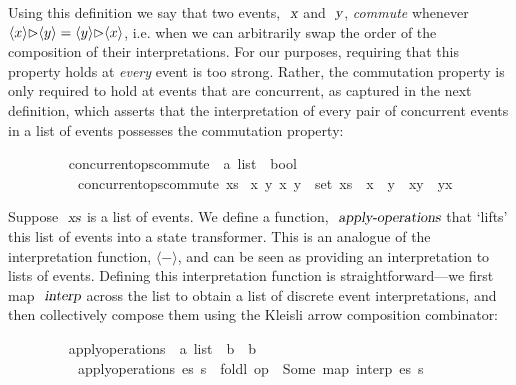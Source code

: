 Using this definition we say that two events, $\isa{x}$ and $\isa{y}$, \emph{commute} whenever $\langle x \rangle {\emph{$\rhd$}} \langle y \rangle = \langle y \rangle {\emph{$\rhd$}} \langle x \rangle$, i.e. when we can arbitrarily swap the order of the composition of their interpretations.
For our purposes, requiring that this property holds at \emph{every} event is too strong.
Rather, the commutation property is only required to hold at events that are concurrent, as captured in the next definition, which asserts that the interpretation of every pair of concurrent events in a list of events possesses the commutation property:
\vspace{0.375em}
\begin{isabellebody}
\ \ \ \ \ \ \ \  concurrent{\isacharunderscore}ops{\isacharunderscore}commute\ {\isacharcolon}{\isacharcolon}\ {\isachardoublequoteopen}{\isacharprime}a\ list\ {\isasymRightarrow}\ bool{\isachardoublequoteclose}\ \isanewline
\ \ \ \ \ \ \ \ \ \ {\isachardoublequoteopen}concurrent{\isacharunderscore}ops{\isacharunderscore}commute\ xs\ {\isasymequiv} {\isasymforall}x\ y{\isachardot}\ {\isacharbraceleft}x{\isacharcomma}\ y{\isacharbraceright}\ {\isasymsubseteq}\ set\ xs\ {\isasymlongrightarrow}\ x\ {\isasymparallel}\ y\ {\isasymlongrightarrow}\ {\isasymlangle}x{\isasymrangle}{\isasymrhd}{\isasymlangle}y{\isasymrangle}\ {\isacharequal}\ {\isasymlangle}y{\isasymrangle}{\isasymrhd}{\isasymlangle}x{\isasymrangle}{\isachardoublequoteclose}
\end{isabellebody}
\vspace{0.375em}
Suppose $\isa{xs}$ is a list of events.
We define a function, $\isa{apply-operations}$ that `lifts' this list of events into a state transformer.
This is an analogue of the interpretation function, $\langle-\rangle$, and can be seen as providing an interpretation to lists of events.
Defining this interpretation function is straightforward---we first map $\isa{interp}$ across the list to obtain a list of discrete event interpretations, and then collectively compose them using the Kleisli arrow composition combinator:
\vspace{0.375em}
\begin{isabellebody}
\ \ \ \ \ \ \ \  apply{\isacharunderscore}operations\ {\isacharcolon}{\isacharcolon}\ {\isachardoublequoteopen}{\isacharprime}a\ list\ {\isasymRightarrow}\ {\isacharprime}b\ {\isasymrightharpoonup}\ {\isacharprime}b{\isachardoublequoteclose}\ \isanewline
\ \ \ \ \ \ \ \ \ \ {\isachardoublequoteopen}apply{\isacharunderscore}operations\ es\ s\ {\isasymequiv}\ {\isacharparenleft}foldl\ {\isacharparenleft}op\ {\isasymrhd}{\isacharparenright}\ Some\ {\isacharparenleft}map\ interp\ es{\isacharparenright}{\isacharparenright}\ s{\isachardoublequoteclose}
\end{isabellebody}
